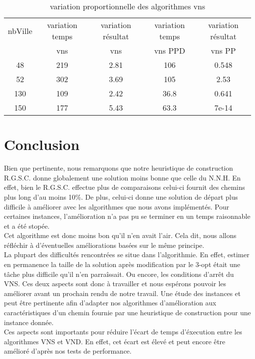 \documentclass[12pt,a4paper]{article}
\begin{document}
\begin{table}[!h]
\centering
\begin{tabular}{|*{5}{c|}}
  \hline
  nbVille & variation temps & variation résultat & variation temps & variation résultat \\
  ~ & vns & vns & vns PPD & vns PP \\
  \hline
  48 & 219 & 2.81 & 106 & 0.548 \\ 
  52 & 302 & 3.69 & 105 & 2.53 \\
  130 & 109 & 2.42 & 36.8 & 0.641 \\
  150 & 177 & 5.43 & 63.3 & 7e-14 \\
  \hline
\end{tabular}
\caption{variation proportionnelle des algorithmes vns}
\label{variationvnsRGSC}
\end{table}

\newpage
\section{Conclusion}
Bien que pertinente, nous remarquons que notre heuristique de construction R.G.S.C. donne globalement une solution moins bonne que celle du N.N.H. En effet, bien le R.G.S.C. effectue plus de comparaisons celui-ci fournit des chemins plus long d'au moins 10\%. De plus, celui-ci donne une solution de départ plus difficile à améliorer avec les algorithmes que nous avons implémentés. Pour certaines instances, l'amélioration n'a pas pu se terminer en un temps raisonnable et a été stopée.\\
Cet algorithme est donc moins bon qu'il n'en avait l'air. Cela dit, nous allons réfléchir à d'éventuelles améliorations basées sur le même principe.\\
La plupart des difficultés rencontrées se situe dans l'algorithmie. En effet, estimer en permanence la taille de la solution après modification par le 3-opt était une tâche plus difficile qu'il n'en parraîssait. Ou encore, les conditions d'arrêt du VNS. Ces deux aspects sont donc à travailler et nous espérons pouvoir les améliorer avant un prochain rendu de notre travail. Une étude des instances et peut être pertinente afin d'adapter nos algorithmes d'amélioration aux caractéristiques d'un chemin fournie par une heuristique de construction pour une instance donnée.\\
Ces aspects sont importants pour réduire l'écart de temps d'éxecution entre les algorithmes VNS et VND. En effet, cet écart est élevé et peut encore être amélioré d'après nos tests de performance.\\
\end{document}
